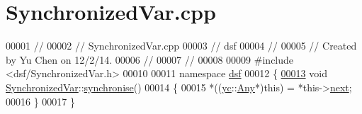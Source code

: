 \hypertarget{_synchronized_var_8cpp_source}{}\section{Synchronized\+Var.\+cpp}
\label{_synchronized_var_8cpp_source}

\begin{DoxyCode}
00001 \textcolor{comment}{//}
00002 \textcolor{comment}{//  SynchronizedVar.cpp}
00003 \textcolor{comment}{//  dsf}
00004 \textcolor{comment}{//}
00005 \textcolor{comment}{//  Created by Yu Chen on 12/2/14.}
00006 \textcolor{comment}{//}
00007 \textcolor{comment}{//}
00008 
00009 \textcolor{preprocessor}{#}\textcolor{preprocessor}{include} \textcolor{preprocessor}{<}\textcolor{preprocessor}{dsf}\textcolor{preprocessor}{/}\textcolor{preprocessor}{SynchronizedVar}\textcolor{preprocessor}{.}\textcolor{preprocessor}{h}\textcolor{preprocessor}{>}
00010 
00011 \textcolor{keyword}{namespace} \hyperlink{namespacedsf_aa16e735f29587f4485b56fc46746f7a9}{dsf}
00012 \{
\hypertarget{_synchronized_var_8cpp_source_l00013}{}\hyperlink{classdsf_1_1_synchronized_var_ac8465a885c4dbb5bc5ca9ad25f42c3ec}{00013}     \textcolor{keywordtype}{void} \hyperlink{namespacedsf_aa16e735f29587f4485b56fc46746f7a9}{SynchronizedVar}::\hyperlink{namespacedsf_aa16e735f29587f4485b56fc46746f7a9}{synchronise}()
00014     \{
00015         *((\hyperlink{namespacedsf_aa16e735f29587f4485b56fc46746f7a9}{yc}::\hyperlink{namespacedsf_aa16e735f29587f4485b56fc46746f7a9}{Any}*)\textcolor{keyword}{this}) = *\textcolor{keyword}{this}->\hyperlink{namespacedsf_aa16e735f29587f4485b56fc46746f7a9}{next};
00016     \}
00017 \}
\end{DoxyCode}
